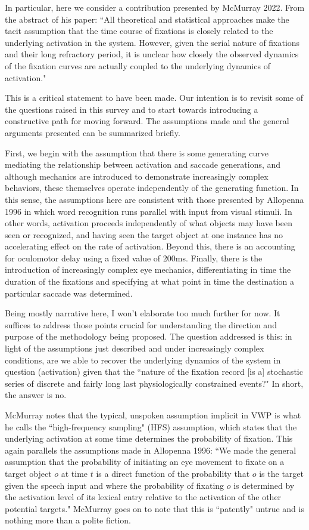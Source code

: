 \documentclass{article}
\begin{document}
In particular, here we consider a contribution presented by McMurray 2022. From the abstract of his paper: ``All theoretical and statistical approaches make the tacit assumption that the time course of fixations is closely related to the underlying activation in the system. However, given the serial nature of fixations and their long refractory period, it is unclear how closely the observed dynamics of the fixation curves are actually coupled to the underlying dynamics of activation."

This is a critical statement to have been made. Our intention is to revisit some of the questions raised in this survey and to start towards introducing a constructive path for moving forward. The assumptions made and the general arguments presented can be summarized briefly. 

First, we begin with the assumption that there is some generating curve mediating the relationship between activation and saccade generations, and although mechanics are introduced to demonstrate increasingly complex behaviors, these themselves operate independently of the generating function. In this sense, the assumptions here are  consistent with those presented by Allopenna 1996 in which word recognition runs parallel with input from visual stimuli. In other words, activation proceeds independently of what objects may have been seen or recognized,  and having seen the target object at one instance has no accelerating effect on the rate of activation. Beyond this, there is an accounting for oculomotor delay using a fixed value of 200ms. Finally, there is the introduction of increasingly complex eye mechanics, differentiating in time the duration of the fixations and specifying at what point in time the destination a particular saccade was determined.

Being mostly narrative here, I won't elaborate too much further for now. It suffices to address those points crucial for understanding the direction and purpose of the methodology being proposed. The question addressed is this: in light of the assumptions just described and under increasingly complex conditions, are we able to recover the underlying dynamics of the system in question (activation) given that the ``nature of the fixation record [is a] stochastic series of discrete and fairly long last physiologically constrained events?" In short, the answer is no. 

McMurray notes that the typical, unspoken assumption implicit in VWP is what he calls the ``high-frequency sampling" (HFS) assumption, which states that the underlying activation at some time determines the probability of fixation. This again parallels the assumptions made in Allopenna 1996: ``We made the general assumption that the probability of initiating an eye movement to fixate on a target object $o$ at time $t$ is a direct function of the probability that $o$ is the target given the speech input and where the probability of fixating $o$ is determined by the activation level of its lexical entry relative to the activation of the other potential targets." McMurray goes on to note that this is ``patently" untrue and is nothing more than a polite fiction.
\end{document}
